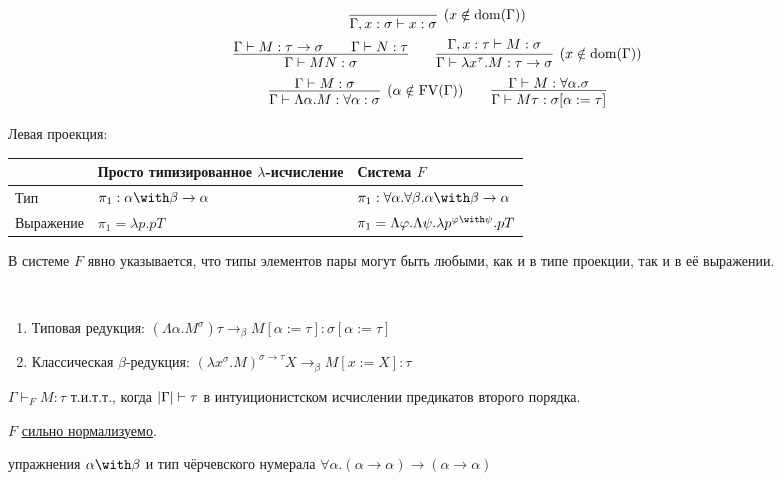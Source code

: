 \begin{definition}
    \inferspacing
    \begin{gather*}
        \infer[(x \notin \mathrm{dom}(\Gamma))]{\Gamma, x : \sigma \vdash x : \sigma}{} \\
        \infer{\Gamma \vdash MN : \sigma}{\Gamma \vdash M : \tau \rightarrow \sigma && \Gamma \vdash N : \tau} \qquad
        \infer[(x \notin \mathrm{dom}(\Gamma))]
                {\Gamma \vdash \lambda x^\tau . M : \tau \rightarrow \sigma}{\Gamma, x : \tau \vdash M : \sigma} \\
        \infer[(\alpha \notin \FV(\Gamma))]{\Gamma \vdash \Lambda \alpha . M : \forall \alpha : \sigma}{\Gamma \vdash M : \sigma} \qquad
        \infer{\Gamma \vdash M \tau : \sigma [\alpha := \tau]}{\Gamma \vdash M : \forall \alpha . \sigma}
    \end{gather*}
\end{definition}

\begin{example} Левая проекция:
    \begin{center}
    \begin{tabular}{l l l} \toprule
        & Просто типизированное $\lambda$-исчисление & Система $F$ \\ \toprule
        Тип & $\pi_1:\alpha\with\beta\rightarrow\alpha$ & $\pi_1:\forall \alpha . \forall \beta . \alpha \with \beta \rightarrow \alpha$ \\
        Выражение & $\pi_1 = \lambda p . p T$ & $\pi_1 = \Lambda \varphi . \Lambda \psi . \lambda p^{\varphi\with\psi} . p T$
        \\ \bottomrule
    \end{tabular}
    \end{center}
В системе $F$ явно указывается, что типы элементов пары могут быть любыми, как и в типе проекции, так и в её выражении.
\end{example}

\begin{definition} \ 
    \begin{enumerate}
        \item Типовая редукция: $\left(\Lambda \alpha . M^\sigma\right) \tau \rightarrow_\beta M[\alpha:=\tau] : \sigma[\alpha := \tau]$
        \item Классическая $\beta$-редукция: $\left(\lambda x^\sigma.M\right)^{\sigma\rightarrow\tau} X \rightarrow_\beta M [x:=X] : \tau$
    \end{enumerate}
\end{definition}

\begin{theorem}
    $\Gamma \vdash_F M :\tau$ т.и.т.т., когда $\left|\Gamma\right| \vdash \tau$ в интуиционистском исчислении предикатов второго порядка.
\end{theorem}

\begin{theorem}
    $F$ \hyperref[strong-normalization]{сильно нормализуемо}.
\end{theorem}

\todo упражнения $\alpha\with\beta$ и тип чёрчевского нумерала
$\forall\alpha.(\alpha\rightarrow\alpha)\rightarrow(\alpha\rightarrow\alpha)$
